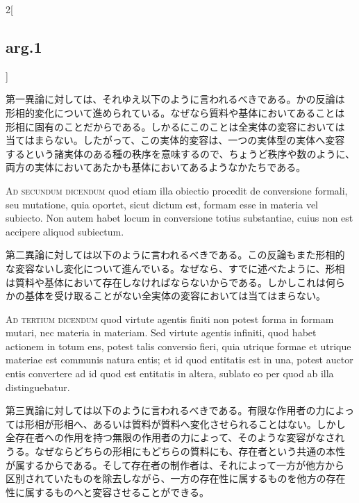 \documentclass[paper=a4paper,fontsize=10pt,jafontsize=9pt,titlepage]{jlreq}
\begin{document}
\begin{paracol}{2}[\subsection{arg.1}]
\switchcolumn

第一異論に対しては、それゆえ以下のように言われるべきである。かの反論は
形相的変化について進められている。なぜなら質料や基体においてあることは
形相に固有のことだからである。しかるにこのことは全実体の変容においては
当てはまらない。したがって、この実体的変容は、一つの実体型の実体へ変容
するという諸実体のある種の秩序を意味するので、ちょうど秩序や数のように、
両方の実体においてあたかも基体においてあるようなかたちである。

\switchcolumn*[\subsection{ad.2}]

{\scshape Ad secundum dicendum} quod etiam illa obiectio procedit de
conversione formali, seu mutatione, quia oportet, sicut dictum est,
formam esse in materia vel subiecto. Non autem habet locum in
conversione totius substantiae, cuius non est accipere aliquod
subiectum.

\switchcolumn

第二異論に対しては以下のように言われるべきである。この反論もまた形相的
な変容ないし変化について進んでいる。なぜなら、すでに述べたように、形相
は質料や基体において存在しなければならないからである。しかしこれは何ら
かの基体を受け取ることがない全実体の変容においては当てはまらない。

\switchcolumn*[\subsection{ad.3}]

{\scshape Ad tertium dicendum} quod virtute agentis finiti non potest
forma in formam mutari, nec materia in materiam. Sed virtute agentis
infiniti, quod habet actionem in totum ens, potest talis conversio
fieri, quia utrique formae et utrique materiae est communis natura
entis; et id quod entitatis est in una, potest auctor entis convertere
ad id quod est entitatis in altera, sublato eo per quod ab illa
distinguebatur.

\switchcolumn

第三異論に対しては以下のように言われるべきである。有限な作用者の力によっ
ては形相が形相へ、あるいは質料が質料へ変化させられることはない。しかし
全存在者への作用を持つ無限の作用者の力によって、そのような変容がなされ
うる。なぜならどちらの形相にもどちらの質料にも、存在者という共通の本性
が属するからである。そして存在者の制作者は、それによって一方が他方から
区別されていたものを除去しながら、一方の存在性に属するものを他方の存在
性に属するものへと変容させることができる。

\end{paracol}
\newpage
{}
{}
\setcounter{section}{5}
\setcounter{subsection}{0}
\end{document}
